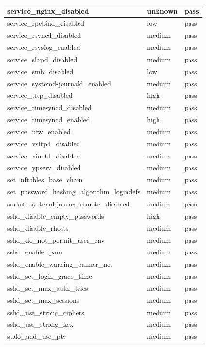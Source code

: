 \begin{longtable}{|p{10cm}|p{2cm}|p{2cm}|}
\hline
service\_nginx\_disabled & unknown & pass \\
\hline
service\_rpcbind\_disabled & low & pass \\
\hline
service\_rsyncd\_disabled & medium & pass \\
\hline
service\_rsyslog\_enabled & medium & pass \\
\hline
service\_slapd\_disabled & medium & pass \\
\hline
service\_smb\_disabled & low & pass \\
\hline
service\_systemd-journald\_enabled & medium & pass \\
\hline
service\_tftp\_disabled & high & pass \\
\hline
service\_timesyncd\_disabled & medium & pass \\
\hline
service\_timesyncd\_enabled & high & pass \\
\hline
service\_ufw\_enabled & medium & pass \\
\hline
service\_vsftpd\_disabled & medium & pass \\
\hline
service\_xinetd\_disabled & medium & pass \\
\hline
service\_ypserv\_disabled & medium & pass \\
\hline
set\_nftables\_base\_chain & medium & pass \\
\hline
set\_password\_hashing\_algorithm\_logindefs & medium & pass \\
\hline
socket\_systemd-journal-remote\_disabled & medium & pass \\
\hline
sshd\_disable\_empty\_passwords & high & pass \\
\hline
sshd\_disable\_rhosts & medium & pass \\
\hline
sshd\_do\_not\_permit\_user\_env & medium & pass \\
\hline
sshd\_enable\_pam & medium & pass \\
\hline
sshd\_enable\_warning\_banner\_net & medium & pass \\
\hline
sshd\_set\_login\_grace\_time & medium & pass \\
\hline
sshd\_set\_max\_auth\_tries & medium & pass \\
\hline
sshd\_set\_max\_sessions & medium & pass \\
\hline
sshd\_use\_strong\_ciphers & medium & pass \\
\hline
sshd\_use\_strong\_kex & medium & pass \\
\hline
sudo\_add\_use\_pty & medium & pass \\

\end{longtable}
